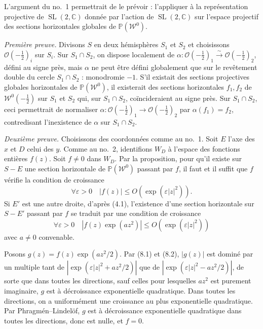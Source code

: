 \documentclass[11pt]{article}
\newcommand{\C}{\mathbb C}
\newcommand{\cO}{\mathcal O}
\newcommand{\cW}{\mathcal W}
\newcommand{\half}{\tfrac12}
\DeclareMathOperator{\SL}{SL}
\begin{document}
L'argument du no.~1 permettrait de le prévoir : l'appliquer à la représentation projective de $\SL(2,\C)$ donnée par l'action de $\SL(2,\C)$ sur l'espace projectif des sections horizontales globales de $\mathbb P(\cW^0)$.

\emph{Première preuve.} Divisons $S$ en deux hémisphères $S_1$ et $S_2$ et choisissons $\cO(-\half)_i$ sur $S_i$. Sur $S_1\cap S_2$, on dispose localement de $\alpha:\cO(-\half)_1\xrightarrow{\sim}\cO(-\half)_2$, défini au signe près, mais $\alpha$ ne peut être défini globalement que sur le revêtement double du cercle $S_1\cap S_2$ : monodromie $-1$. S'il existait des sections projectives globales horizontales de $\mathbb P(\cW^0)$, il existerait des sections horizontales $f_1,f_2$ de $\cW^0(-\half)$ sur $S_1$ et $S_2$ qui, sur $S_1\cap S_2$, coïncideraient au signe près. Sur $S_1\cap S_2$, ceci permettrait de normaliser $\alpha:\cO(-\half)_1\to\cO(-\half)_2$ par $\alpha(f_1)=f_2$, contredisant l'inexistence de $\alpha$ sur $S_1\cap S_2$.

\emph{Deuxième preuve.} Choisissons des coordonnées comme au no.~1. Soit $E$ l'axe des $x$ et $D$ celui des $y$. Comme au no.~2, identifions $W_D$ à l'espace des fonctions entières $f(z)$. Soit $f\ne0$ dans $W_D$. Par la proposition, pour qu'il existe sur $S-E$ une section horizontale de $\mathbb P(\cW^0)$ passant par $f$, il faut et il suffit que $f$ vérifie la condition de croissance
\begin{equation}\tag{8.1}
\forall\varepsilon>0\quad |f(z)|\le O(\exp(\varepsilon |z|^2)).
\end{equation}
Si $E'$ est une autre droite, d'après (4.1), l'existence d'une section horizontale sur $S-E'$ passant par $f$ se traduit par une condition de croissance
\begin{equation}\tag{8.2}
\forall\varepsilon>0\quad |f(z)\exp(az^2)|\le O(\exp(\varepsilon |z|^2))
\end{equation}
avec $a\ne0$ convenable.

Posons $g(z)=f(z)\exp(az^2/2)$. Par (8.1) et (8.2), $|g(z)|$ est dominé par un multiple tant de $|\exp(\varepsilon |z|^2+az^2/2)|$ que de $|\exp(\varepsilon |z|^2-az^2/2)|$, de sorte que dans toutes les directions, sauf celles pour lesquelles $az^2$ est purement imaginaire, $g$ est à décroissance exponentielle quadratique. Dans toutes les directions, on a uniformément une croissance au plus exponentielle quadratique. Par Phragmén--Lindelöf, $g$ est à décroissance exponentielle quadratique dans toutes les directions, donc est nulle, et $f=0$.
\end{document}
